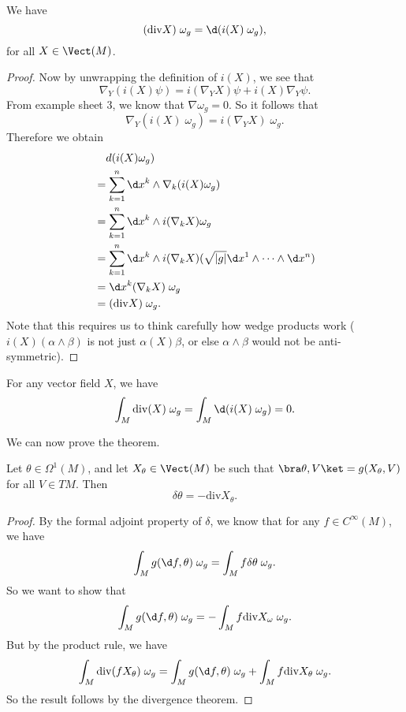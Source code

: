 \documentclass[a4paper]{article}
\renewcommand\div{\mathrm{div}}
\begin{document}
\begin{lemma}
  We have
  \[
    (\div X)\;\omega_g = \d(i(X)\;\omega_g),
  \]
  for all $X \in \Vect(M)$.
\end{lemma}

\begin{proof}
  Now by unwrapping the definition of $i(X)$, we see that
  \[
    \nabla_Y (i (X) \psi) = i(\nabla_Y X)\psi + i(X) \nabla_Y \psi.
  \]
  From example sheet 3, we know that $\nabla \omega_g = 0$. So it follows that
  \[
    \nabla_Y (i(X)\;\omega_g) = i(\nabla_Y X)\;\omega_g.
  \]
  Therefore we obtain
  \begin{align*}
    &\hphantom{={}}d(i(X) \omega_g) \\
    &= \sum_{k = 1}^n \d x^k \wedge \nabla_k (i(X) \omega_g)\\
    &= \sum_{k = 1}^n \d x^k \wedge i(\nabla_k X) \omega_g\\
    &= \sum_{k = 1}^n \d x^k \wedge i (\nabla_k X) (\sqrt{|g|} \d x^1 \wedge \cdots \wedge \d x^n)\\
    &= \d x^k(\nabla_k X)\; \omega_g\\
    &= (\div X)\; \omega_g.
  \end{align*}
  Note that this requires us to think carefully how wedge products work ($i(X)(\alpha \wedge \beta)$ is not just $\alpha(X) \beta$, or else $\alpha \wedge \beta$ would not be anti-symmetric).
\end{proof}

\begin{cor}
  For any vector field $X$, we have
  \[
    \int_M \div(X) \;\omega_g = \int_M \d (i(X) \;\omega_g) = 0.
  \]
\end{cor}
We can now prove the theorem.

\begin{thm}
  Let $\theta \in \Omega^1(M)$, and let $X_\theta \in \Vect(M)$ be such that $\bra \theta, V\ket = g(X_\theta, V)$ for all $V \in TM$. Then
  \[
    \delta \theta = - \div X_\theta.
  \]
\end{thm}

\begin{proof}
  By the formal adjoint property of $\delta$, we know that for any $f \in C^\infty(M)$, we have
  \[
    \int_M g(\d f, \theta)\;\omega_g = \int_M f \delta \theta\; \omega_g.
  \]
  So we want to show that
  \[
    \int_M g(\d f, \theta)\;\omega_g = - \int_M f\div X_\omega \; \omega_g.
  \]
  But by the product rule, we have
  \[
    \int_M \div (f X_\theta)\; \omega_g = \int_M g(\d f, \theta) \;\omega_g + \int_M f \div X_\theta\; \omega_g.
  \]
  So the result follows by the divergence theorem.
\end{proof}
\end{document}
